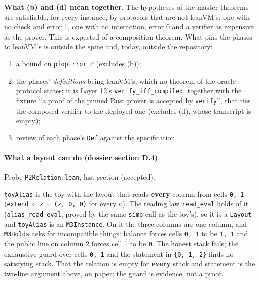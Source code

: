 \textbf{What (b) and (d) mean together.} The hypotheses of the master theorems are satisfiable, for every instance, by protocols that are not leanVM's: one with no check and error 1, one with no interaction, error 0 and a verifier as expensive as the prover. This is expected of a composition theorem. What pins the phases to leanVM's is outside the spine and, today, outside the repository:

\begin{enumerate}
\item a bound on \texttt{piopError P} (excludes (b));
\item the phases' \emph{definitions} being leanVM's, which no theorem of the oracle protocol states; it is Layer 12's \texttt{verify\_\allowbreak{}iff\_\allowbreak{}compiled}, together with the fixture \enquote{a proof of the pinned Rust prover is accepted by \texttt{verify}}, that ties the composed verifier to the deployed one (excludes (d), whose transcript is empty);
\item review of each phase's \texttt{Def} against the specification.
\end{enumerate}

\paragraph{What a layout can do (dossier section D.4)}\label{sec:gen-spine-D4}

Probe \texttt{P2Relation.\allowbreak{}lean}, last section (accepted).

\texttt{toyAlias} is the toy with the layout that reads \textbf{every} column from cells \texttt{0,\allowbreak{} 1} (\texttt{extend c z = (\allowbreak{}z,\allowbreak{} 0,\allowbreak{} 0)} for every \texttt{c}). The reading law \texttt{read\_\allowbreak{}eval} holds of it (\texttt{alias\_\allowbreak{}read\_\allowbreak{}eval}, proved by the same \texttt{simp} call as the toy's), so it is a \texttt{Layout} and \texttt{toyAlias} is an \texttt{M3Instance}. On it the three columns are one column, and \texttt{M3Holds} asks for incompatible things: balance forces cells \texttt{0,\allowbreak{} 1} to be \texttt{1,\allowbreak{} 1} and the public line on column 2 forces cell 1 to be \texttt{0}. The honest stack fails; the exhaustive guard over cells \texttt{0,\allowbreak{} 1} and the statement in \texttt{\{0,\allowbreak{} 1,\allowbreak{} 2\}} finds no satisfying stack. That the relation is empty for \textbf{every} stack and statement is the two-line argument above, on paper; the guard is evidence, not a proof.

